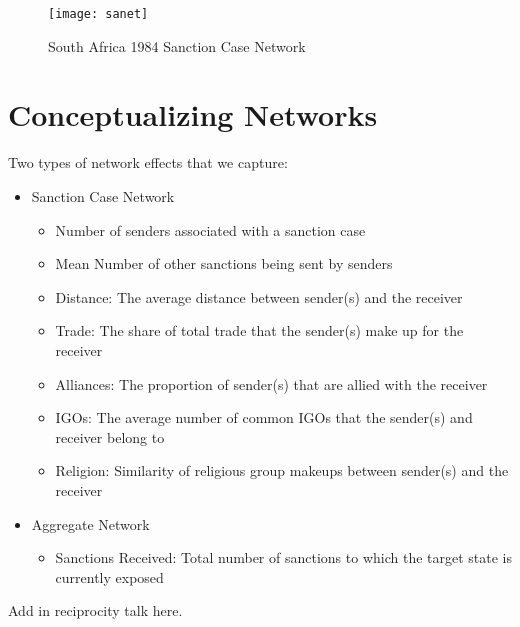 \begin{figure}[ht]
	\centering
	\texttt{[image: sanet]}
	\caption{South Africa 1984 Sanction Case Network}
\end{figure}

\section{Conceptualizing Networks}
Two types of network effects that we capture:

\begin{itemize}
	\item Sanction Case Network
	\begin{itemize}
		\item Number of senders associated with a sanction case
		\item Mean Number of other sanctions being sent by senders
		\item Distance: The average distance between sender(s) and the receiver
		\item Trade: The share of total trade that the sender(s) make up for the receiver		
		\item Alliances: The proportion of sender(s) that are allied with the receiver
		\item IGOs: The average number of common IGOs that the sender(s) and receiver belong to
		\item Religion: Similarity of religious group makeups between sender(s) and the receiver
	\end{itemize}
	\item Aggregate Network
	\begin{itemize}
		\item Sanctions Received: Total number of sanctions to which the target state is currently exposed
	\end{itemize}
\end{itemize}

Add in reciprocity talk here. 